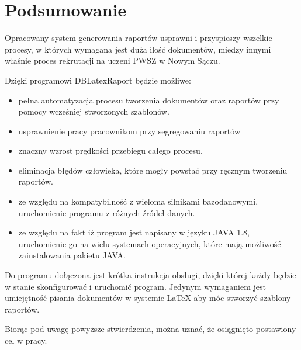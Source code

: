 \chapter{Podsumowanie}
Opracowany system generowania raportów usprawni i przyspieszy wszelkie procesy, w których wymagana jest duża ilość dokumentów, miedzy innymi właśnie proces rekrutacji na uczeni PWSZ w Nowym Sączu.\vspace{5mm}
\par
Dzięki programowi DBLatexRaport będzie możliwe:\vspace{5mm}
\begin{itemize}
\item pełna automatyzacja procesu tworzenia dokumentów oraz raportów przy pomocy wcześniej stworzonych szablonów.\vspace{5mm}
\item usprawnienie pracy pracownikom przy segregowaniu raportów\vspace{5mm}
\item znaczny wzrost prędkości przebiegu całego procesu.\vspace{5mm}
\item eliminacja błędów człowieka, które mogły powstać przy ręcznym tworzeniu raportów.\vspace{5mm}
\item ze względu na kompatybilność z wieloma silnikami bazodanowymi, uruchomienie programu z różnych źródeł danych.\vspace{5mm}
\item ze względu na fakt iż program jest napisany w języku JAVA 1.8, uruchomienie go na wielu systemach operacyjnych, które mają możliwość zainstalowania pakietu JAVA.\vspace{5mm}
\end{itemize}\vspace{5mm}
\par
Do programu dołączona jest krótka instrukcja obsługi, dzięki której każdy będzie w stanie skonfigurować i uruchomić program. Jedynym wymaganiem jest umiejętność pisania dokumentów w systemie LaTeX aby móc stworzyć szablony raportów.
\par 
Biorąc pod uwagę powyższe stwierdzenia, można uznać, że osiągnięto postawiony cel w pracy.